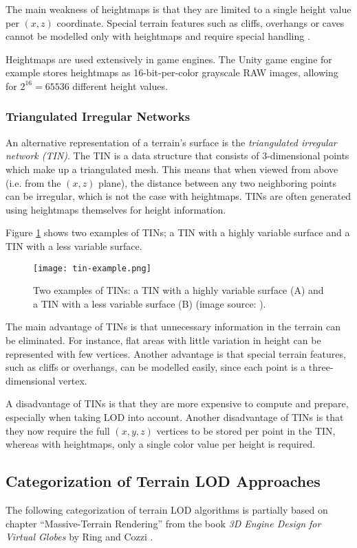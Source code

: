 The main weakness of heightmaps is that they are limited to 
a single height value per $(x,z)$ coordinate. Special 
terrain features such as cliffs, overhangs or caves 
cannot be modelled only with heightmaps and require 
special handling \cite{lodfor3dgraphics}.

Heightmaps are used extensively in game engines.
The Unity game engine for example stores heightmaps as 16-bit-per-color 
grayscale RAW images, allowing for $2^{16} = 65536$ different height values.

\subsubsection{Triangulated Irregular Networks}
An alternative representation of a terrain's surface is the \textit{triangulated irregular network (TIN)}.
The TIN is a data structure that consists of 3-dimensional points
which make up a triangulated mesh.
This means that when viewed from above (i.e. from the $(x,z)$ plane), 
the distance between any two neighboring points can be irregular,
which is not the case with heightmaps. TINs 
are often generated using heightmaps themselves for 
height information.

Figure \ref{fig:tin-example} shows two examples of TINs;
a TIN with a highly variable surface and a TIN with a 
less variable surface.

\begin{figure}[H]
  \centering
  \texttt{[image: tin-example.png]}
  \caption{Two examples of TINs: a TIN with a highly variable surface (A) and a TIN with a less variable surface (B) (image source: \cite{tinimage}).}\label{fig:tin-example}
\end{figure}

The main advantage of TINs is that unnecessary information 
in the terrain can be eliminated. For instance, flat areas with little variation 
in height can be represented with few vertices. 
Another advantage is that special terrain features, 
such as cliffs or overhangs, can be modelled easily, 
since each point is a three-dimensional vertex.

A disadvantage of TINs is that they 
are more expensive to compute and prepare, especially 
when taking LOD into account.
Another disadvantage of TINs is that 
they now require the full $(x,y,z)$ vertices 
to be stored per point in the TIN, whereas with 
heightmaps, only a single color value per height is required.

\subsection{Categorization of Terrain LOD Approaches}
The following categorization of terrain LOD algorithms 
is partially based on chapter ``Massive-Terrain Rendering'' from the book \textit{3D Engine Design for Virtual Globes} by Ring and Cozzi \cite[p.~365]{3denginedesignforvirtualglobes}. 

